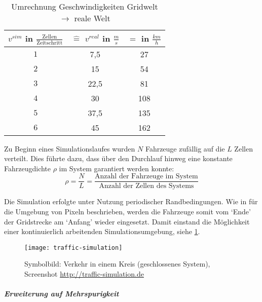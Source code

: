 \begin{table}[ht]
\begin{center}
\setlength{\tabcolsep}{0.5em} %
{\renewcommand{\arraystretch}{1.2}%
\begin{tabular}{| c | c | c |}
\hline 
$v^{sim}$ in $\frac{\text{Zellen}}{\text{Zeitschritt}}$ & $\widehat{=}$ $v^{real}$ in $\frac{m}{s}$ & $=$ in $\frac{km}{h}$ \\ \hline 
$1$ & 7,5 & 27 \\ \hline
$2$ & 15 & 54 \\ \hline
$3$ & 22,5 & 81 \\ \hline
$4$ & 30 & 108 \\ \hline
$5$ & 37,5 & 135 \\ \hline
$6$ & 45 & 162 \\ \hline
\end{tabular}
}
\caption{Umrechnung Geschwindigkeiten Gridwelt $\rightarrow$ reale Welt}
\end{center}
\label{tab:umrechnung-zelle-kmh}
\end{table}

Zu Beginn eines Simulationslaufes wurden $N$ Fahrzeuge zufällig auf die $L$ Zellen verteilt.
Dies führte dazu, dass über den Durchlauf hinweg eine konstante Fahrzeugdichte $\rho$ im System garantiert werden konnte:
\begin{equation}
\rho = \dfrac{N}{L} = \dfrac{\text{Anzahl der Fahrzeuge im System}}{\text{Anzahl der Zellen des Systems}}
\nonumber
\end{equation}

\noindent
Die Simulation erfolgte unter Nutzung periodischer Randbedingungen. 
Wie in \cite[Abb. 1.5]{peri-rand} für die Umgebung von Pixeln beschrieben, werden die Fahrzeuge somit vom \enquote*{Ende} der Gridstrecke am \enquote*{Anfang} wieder eingesetzt. 
Damit einstand die Möglichkeit einer kontinuierlich arbeitenden Simulationsumgebung, siehe \cref{figure:traffic-simulation}.
\begin{figure}[hptb]
 \centering
 \texttt{[image: traffic-simulation]}
 \caption[Darstellung des Verkehrs in einem geschlossenen System]
 		{Symbolbild: Verkehr in einem Kreis (geschlossenes System), Screenshot \url{http://traffic-simulation.de}}
 \label{figure:traffic-simulation}
\end{figure} 



\subparagraph{Erweiterung auf Mehrspurigkeit}

